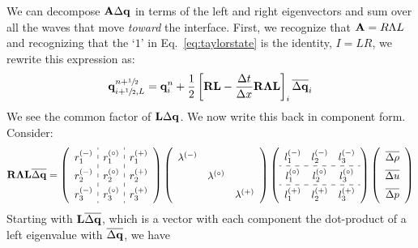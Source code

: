 We can decompose ${\bf A} \Delta {\bf q}$ in terms of the left and right
eigenvectors and sum over all the waves that move {\em toward} the
interface.  First, we recognize that ${\bf A} = R \Lambda L$ and recognizing
that the `$1$'
in Eq.~\ref{eq:taylorstate} is the identity, $I = LR$, we rewrite this
expression as:
\begin{equation}
{\bf q}_{i+{\sfrac{1}{2}},L}^{n+{\sfrac{1}{2}}} = {\bf q}_i^n +
     \frac{1}{2} \left [ {\bf R}{\bf L} - \frac{\Delta t}{\Delta x} {\bf R}{\boldsymbol{\Lambda}} {\bf L} \right ]_i \overline{\Delta {\bf q}}_i
\end{equation}
We see the common factor of ${\bf L} \Delta {\bf q}$.  We now write this back in
component form.  Consider:
\begin{equation}
\renewcommand{\arraystretch}{1.5}
\Rb\Lambdab \Lb \overline{\Delta \qb} =
   \left ( \begin{array}{c:c:c}
             r_1^\evm & r_1^\evz & r_1^\evp \\
             r_2^\evm & r_2^\evz & r_2^\evp \\
             r_3^\evm & r_3^\evz & r_3^\evp \end{array} \right )
   \left ( \begin{array}{ccc}
             \lambda^\evm &              & \\
                          & \lambda^\evz & \\
                          &              & \lambda^\evp \end{array} \right )
   \left ( \begin{array}{ccc}
             l_1^\evm & l_2^\evm & l_3^\evm \\
             \hdashline
             l_1^\evz & l_2^\evz & l_3^\evz \\
             \hdashline
             l_1^\evp & l_2^\evp & l_3^\evp \end{array} \right )
   \left ( \begin{array}{c}
            \overline{\Delta \rho} \\
            \overline{\Delta u} \\
            \overline{\Delta p} \end{array} \right )
\renewcommand{\arraystretch}{1.0}
\end{equation}
Starting with ${\bf L} \overline{\Delta {\bf q}}$, which is a vector with each component
the dot-product of a left eigenvalue with $\overline{\Delta {\bf q}}$, we have
